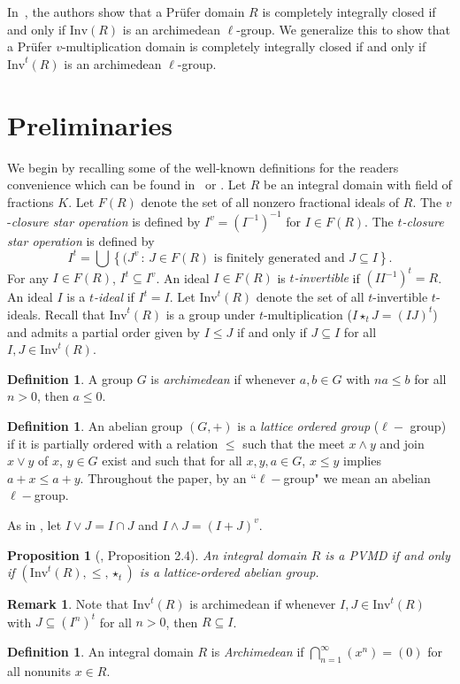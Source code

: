 \documentclass[12pt]{amsart}
\newtheorem{proposition}[theorem]{Proposition}
\theoremstyle{definition}\newtheorem{remark}[theorem]{Remark}
\theoremstyle{definition}\newtheorem{definition}[theorem]{Definition}
\begin{document}
In~\cite[Proposition 3.1]{ICPrufer}, the authors show that a Pr\"{u}fer domain $R$ is completely integrally closed if and only if $\text{Inv}(R)$ is an archimedean $\ell$-group. We generalize this to show that a Pr\"{u}fer $v$-multiplication domain is completely integrally closed if and only if $\text{Inv}^t(R)$ is an archimedean $\ell$-group. 

\section{Preliminaries}
We begin by recalling some of the well-known definitions for the readers convenience which can be found in~\cite{Elliott19} or \cite{chapman2000}. Let $R$ be an integral domain with field of fractions $K$. Let $F(R)$ denote the set of all nonzero fractional ideals of $R$. The $v$-\textit{closure star operation} is defined by $I^v = (I^{-1})^{-1}$ for $I \in F(R)$. The \textit{$t$-closure star operation} is defined by 
$$I^t = \bigcup \left\{(J^v\, : \, J \in F(R) \text{ is finitely generated and } J \subseteq I\right\}.$$
For any $I \in F(R)$, $I^t \subseteq I^v$. An ideal $I\in F(R)$ is \textit{$t$-invertible} if $(II^{-1})^t=R$. 
An ideal $I$ is a \textit{$t$-ideal} if $I^t=I$.
Let $\text{Inv}^t(R)$ denote the set of all $t$-invertible $t$-ideals. Recall that $\text{Inv}^t(R)$ is a group under $t$-multiplication ($I\star_t J=(IJ)^t$) and admits a partial order given by $I\leq J$ if and only if $J\subseteq I$ for all $I, J \in \text{Inv}^t(R)$.

\begin{definition}
A group $G$ is \textit{archimedean} if whenever $a,b\in G$ with $na\leq b$ for all $n>0$, then $a\leq 0 $. 
\end{definition}
\begin{definition}
 An abelian group $(G,+)$ is a \textit{lattice ordered group} ($\ell-$ group) if it is partially ordered with a relation $\leq$ such that the meet $x\wedge y$ and join $x\vee y$ of $x$, $y\in G$ exist and such that for all $x, y, a \in G$, $x \leq y$ implies $a+x\leq a+y$. Throughout the paper, by an ``$\ell-$group" we mean an abelian $\ell-$group.
 \end{definition}
As in \cite{Zafrullah2000}, let $I \vee J = I\cap J$ and $I\wedge J=(I+J)^v$.


\begin{proposition}[\cite{Zafrullah2000}, Proposition 2.4]\label{Prop:l-group}
    An integral domain $R$ is a PVMD  if and only if $(\text{Inv}^t(R), \leq, \star_t) $ is a lattice-ordered abelian group. 
\end{proposition}
\begin{remark}\label{Rmk1}
Note that $\text{Inv}^t(R)$ is archimedean if whenever $I,J \in \text{Inv}^t(R)$ with $J\subseteq (I^n)^t$ for all $n>0$, then $R\subseteq I$.
\end{remark}
\begin{definition}
An integral domain $R$ is \textit{Archimedean} if $\bigcap\limits_{n=1}^\infty (x^n)=(0)$ for all nonunits $x\in R$. 
\end{definition}
\end{document}
